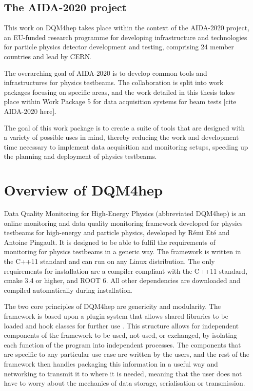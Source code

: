 \subsection*{The AIDA-2020 project}
This work on DQM4hep takes place within the context of the AIDA-2020 project, an EU-funded research programme for developing infrastructure and technologies for particle physics detector development and testing, comprising 24 member countries and lead by CERN.

The overarching goal of AIDA-2020 is to develop common tools and infrastructures for physics testbeams. The collaboration is split into work packages focusing on specific areas, and the work detailed in this thesis takes place within Work Package 5 for data acquisition systems for beam tests [cite AIDA-2020 here]. 

The goal of this work package is to create a suite of tools that are designed with a variety of possible uses in mind, thereby reducing the work and development time necessary to implement data acquisition and monitoring setups, speeding up the planning and deployment of physics testbeams. 

\section{Overview of DQM4hep}
Data Quality Monitoring for High-Energy Physics (abbreviated DQM4hep) is an online monitoring and data quality monitoring framework developed for physics testbeams for high-energy and particle physics, developed by R\'{e}mi Et\'{e} and Antoine Pingault. It is designed to be able to fulfil the requirements of monitoring for physics testbeams in a generic way. The framework is written in the C++11 standard and can run on any Linux distribution. The only requirements for installation are a compiler compliant with the C++11 standard, cmake 3.4 or higher, and ROOT 6. All other dependencies are downloaded and compiled automatically during installation. 

The two core principles of DQM4hep are genericity and modularity. The framework is based upon a plugin system that allows shared libraries to be loaded and hook classes for further use \cite{aida2020-milestone-dqm4hep}. This structure allows for independent components of the framework to be used, not used, or exchanged, by isolating each function of the program into independent processes. The components that are specific to any particular use case are written by the users, and the rest of the framework then handles packaging this information in a useful way and networking to transmit it to where it is needed, meaning that the user does not have to worry about the mechanics of data storage, serialisation or transmission. 

